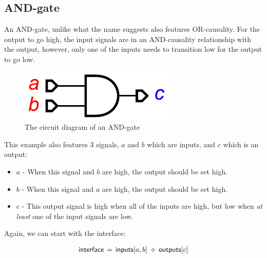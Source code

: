 \documentclass[british,conference,compsoc]{IEEEtran}
\begin{document}

\subsection{AND-gate}

An AND-gate, unlike what the name suggests also features OR-causality. 
For the output to go high, the input signals are in an AND-causality relationship
with the output, however, only one of the inputs needs to transition low for the 
output to go low. 


\begin{figure}[h]
\begin{centering}
\includegraphics[scale=0.55]{Images/and-gate-circuit}
\par\end{centering}

\protect\caption{\label{fig:or-gate-circuit} The circuit diagram of an AND-gate}
\end{figure}

This example also features 3 signals, $a$ and $b$ which are inputs, and $c$
which is an output:

\begin{itemize}
  \item $a$ - When this signal and $b$ are high, the output should be set high.
  \item $b$ - When this signal and $a$ are high, the output should be set high.
  \item $c$ - This output signal is high when all of the inputs are high, but low when
		\emph{at least} one of the input signals are low.
\end{itemize}

\noindent Again, we can start with the interface: 

\[
\begin{array}{lcl}
\mathsf{interface}&\hspace{-2mm}=&\hspace{-2mm}\mathsf{inputs}[a, b]~\diamond~\mathsf{outputs}[c]
\end{array}
\]
\end{document}
